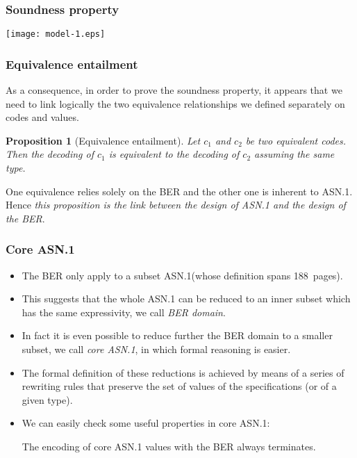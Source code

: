 \documentclass[compress,dvips,xcolor={dvipsnames},t]{beamer}
\newtheorem{proposition}{Proposition}
\newcommand\ASN{\textsf{ASN.1}\xspace}
\newcommand{\core}{core \ASN}
\begin{document}
\begin{frame}
\frametitle{Soundness property}

\centerline{\texttt{[image: model-1.eps]}}

\end{frame}


\begin{frame}
\frametitle{Equivalence entailment}

As a consequence, in order to prove the soundness property, it appears
that we need to link logically the two equivalence relationships we
defined separately on codes and values.

\begin{proposition}[Equivalence entailment]
Let $c_1$ and $c_2$ be two equivalent codes. Then the decoding of
$c_1$ is equivalent to the decoding of $c_2$ assuming the same type.
\end{proposition}

\bigskip

One equivalence relies solely on the BER and the other one is inherent
to \ASN. Hence \emph{this proposition is the link between the design
  of \ASN and the design of the BER}.

\end{frame}

\begin{frame}
\frametitle{Core \ASN}

\begin{itemize}

  \item The BER only apply to a subset \ASN (whose definition spans 
  188~pages).

  \item This suggests that the whole \ASN can be reduced to an inner
  subset which has the same expressivity, we call \emph{BER domain}.

  \item In fact it is even possible to reduce further the BER domain
  to a smaller subset, we call \emph{\core}, in which formal
  reasoning is easier.

  \item The formal definition of these reductions is achieved by means
  of a series of rewriting rules that preserve the set of values of
  the specifications (or of a given type).

  \item We can easily check some useful properties in \core:
  \begin{theorem}
    The encoding of \core values with the BER always terminates.
  \end{theorem}

\end{itemize}

\end{frame}
\end{document}
